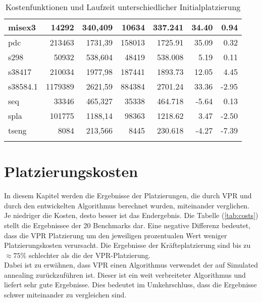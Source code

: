 \begin{center}
\begin{longtable}{| l | r | r | r | r | r | r |}
                    misex3      &   14292   &   340,409     &   10634       &    337.241    & 34.40     & 0.94   \\ \hline        
                    pdc         &   213463  &   1731,39     &   158013      &    1725.91    & 35.09     & 0.32   \\ \hline        
                    s298        &   50932   &   538,604     &   48419       &    538.008    & 5.19      & 0.11   \\ \hline        
                    s38417      &   210034  &   1977,98     &   187441      &    1893.73    & 12.05     & 4.45   \\ \hline        
                    s38584.1    &   1179389 &   2621,59     &   884384      &    2701.24    & 33.36     & -2.95   \\ \hline        
                    seq         &   33346   &   465,327     &   35338       &    464.718    & -5.64     & 0.13   \\ \hline        
                    spla        &   101775  &   1188,14     &   98363       &    1218.62    & 3.47      & -2.50   \\ \hline        
                    tseng       &   8084    &   213,566     &   8445        &    230.618    & -4.27     & -7.39   \\ \hline        
                \caption{Kostenfunktionen und Laufzeit unterschiedlicher Initialplatzierung}
                \label{tab:init}
            \end{longtable}
        \end{center}



    \section{Platzierungskosten}\label{sec:result-costs}

        In diesem Kapitel werden die Ergebnisse der Platzierungen,
        die durch VPR und durch den entwickelten Algorithmus berechnet wurden, miteinander verglichen.
        Je niedriger die Kosten, desto besser ist das Endergebnis. Die Tabelle (\ref{tab:costs})
        stellt die Ergebnissee der 20 Benchmarks dar. Eine negative Differenz bedeutet,
        dass die VPR Platzierung um den jeweiligen prozentualen Wert weniger Platzierungskosten verursacht.
        Die Ergebnisse der Kräfteplatzierung sind bis zu $\approx 75 \%$
        schlechter als die der VPR-Platzierung.\\
        Dabei ist zu erwähnen, dass VPR einen Algorithmus verwendet
        der auf Simulated annealing zurückzuführen ist.
        Dieser ist ein weit verbreiteter Algorithmus und liefert sehr gute Ergebnisse.
        Dies bedeutet im Umkehrschluss, dass die Ergebnisse schwer miteinander zu vergleichen sind. 

